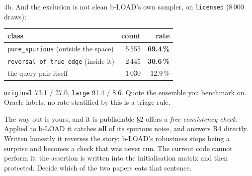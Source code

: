 \documentclass[10pt,aspectratio=169]{beamer}
\newcommand{\wn}[1]{\textcolor{warn}{#1}}
\begin{document}
\begin{frame}[shrink=10]{4b. And the exclusion is not clean}
b-LOAD's own sampler, on \texttt{licensed} (8\,000 draws):

\begin{center}
\begin{tabular}{lrr}
\toprule
class & count & rate \\
\midrule
\texttt{pure\_spurious} \small(outside the space) & 5\,555 & \textbf{69.4\,\%} \\
\texttt{reversal\_of\_true\_edge} \small(inside it) & 2\,445 & \textbf{30.6\,\%} \\
the query pair itself & 1\,030 & 12.9\,\% \\
\bottomrule
\end{tabular}
\end{center}

\small \texttt{original} 73.1 / 27.0, \texttt{large} 91.4 / 8.6. Quote the ensemble you benchmark on.
\wn{Oracle labels: no rate stratified by this is a triage rule.}

\normalsize
\medskip
\begin{block}{The way out is yours, and it is publishable}
\S2 offers a \emph{free consistency check}. Applied to b-LOAD it catches \textbf{all} of its spurious
noise, and answers R4 directly. Written honestly it reverses the story: b-LOAD's robustness stops
being a surprise and becomes a check that was never run. \wn{The current code cannot perform it: the
assertion is written into the initialisation matrix and then protected.} Decide which of the two
papers eats that sentence.
\end{block}
\end{frame}
\end{document}
